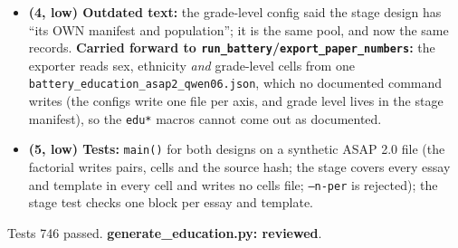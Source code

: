 \documentclass{article}
\begin{document}
\begin{itemize}
        differently on essays that group actually wrote?; decided 2026-09-28, as for credit and hiring); the
        datasets keep all but the quality label and the prompt out of every result.
  \item \textbf{(4, low) Outdated text:} the grade-level config said the stage design has ``its OWN manifest and
        population''; it is the same pool, and now the same records. \textbf{Carried forward to
        \texttt{run\_battery}/\texttt{export\_paper\_numbers}:} the exporter reads sex, ethnicity \emph{and}
        grade-level cells from one \texttt{battery\_education\_asap2\_qwen06.json}, which no documented command
        writes (the configs write one file per axis, and grade level lives in the stage manifest), so the
        \texttt{edu*} macros cannot come out as documented.
  \item \textbf{(5, low) Tests:} \texttt{main()} for both designs on a synthetic ASAP 2.0 file (the factorial
        writes pairs, cells and the source hash; the stage covers every essay and template in every cell and writes
        no cells file; \texttt{--n-per} is rejected); the stage test checks one block per essay and template.
\end{itemize}
Tests 746 passed. \textbf{generate\_education.py: reviewed}.
\end{document}
